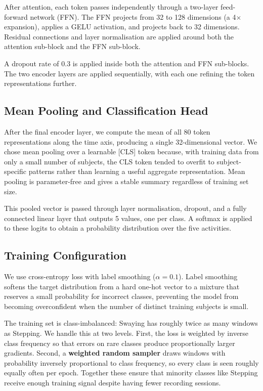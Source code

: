 \documentclass[11pt,a4paper,twocolumn]{article}
\begin{document}
After attention, each token passes independently through a two-layer feed-forward network (FFN). The FFN projects from 32 to 128 dimensions (a 4$\times$ expansion), applies a GELU activation, and projects back to 32 dimensions. Residual connections and layer normalisation are applied around both the attention sub-block and the FFN sub-block.

A dropout rate of 0.3 is applied inside both the attention and FFN sub-blocks. The two encoder layers are applied sequentially, with each one refining the token representations further.

\subsection{Mean Pooling and Classification Head}

After the final encoder layer, we compute the mean of all 80 token representations along the time axis, producing a single 32-dimensional vector. We chose mean pooling over a learnable [CLS] token because, with training data from only a small number of subjects, the CLS token tended to overfit to subject-specific patterns rather than learning a useful aggregate representation. Mean pooling is parameter-free and gives a stable summary regardless of training set size.

This pooled vector is passed through layer normalisation, dropout, and a fully connected linear layer that outputs 5 values, one per class. A softmax is applied to these logits to obtain a probability distribution over the five activities.

\subsection{Training Configuration}

We use cross-entropy loss with label smoothing ($\alpha = 0.1$). Label smoothing softens the target distribution from a hard one-hot vector to a mixture that reserves a small probability for incorrect classes, preventing the model from becoming overconfident when the number of distinct training subjects is small.

The training set is class-imbalanced: Swaying has roughly twice as many windows as Stepping. We handle this at two levels. First, the loss is weighted by inverse class frequency so that errors on rare classes produce proportionally larger gradients. Second, a \textbf{weighted random sampler} draws windows with probability inversely proportional to class frequency, so every class is seen roughly equally often per epoch. Together these ensure that minority classes like Stepping receive enough training signal despite having fewer recording sessions.
\end{document}
